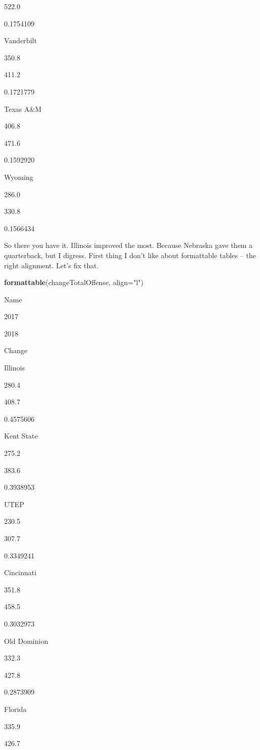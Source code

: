 \documentclass[]{book}
\newenvironment{Shaded}{\begin{snugshade}}{\end{snugshade}}
\newcommand{\KeywordTok}[1]{\textcolor[rgb]{0.13,0.29,0.53}{\textbf{#1}}}
\newcommand{\DataTypeTok}[1]{\textcolor[rgb]{0.13,0.29,0.53}{#1}}
\newcommand{\StringTok}[1]{\textcolor[rgb]{0.31,0.60,0.02}{#1}}
\newcommand{\NormalTok}[1]{#1}
\begin{document}
522.0

0.1754109

Vanderbilt

350.8

411.2

0.1721779

Texas A\&M

406.8

471.6

0.1592920

Wyoming

286.0

330.8

0.1566434

So there you have it. Illinois improved the most. Because Nebraska gave
them a quarterback, but I digress. First thing I don't like about
formattable tables -- the right alignment. Let's fix that.

\begin{Shaded}
\begin{Highlighting}[]
\KeywordTok{formattable}\NormalTok{(changeTotalOffense, }\DataTypeTok{align=}\StringTok{"l"}\NormalTok{)}
\end{Highlighting}
\end{Shaded}

Name

2017

2018

Change

Illinois

280.4

408.7

0.4575606

Kent State

275.2

383.6

0.3938953

UTEP

230.5

307.7

0.3349241

Cincinnati

351.8

458.5

0.3032973

Old Dominion

332.3

427.8

0.2873909

Florida

335.9

426.7
\end{document}
